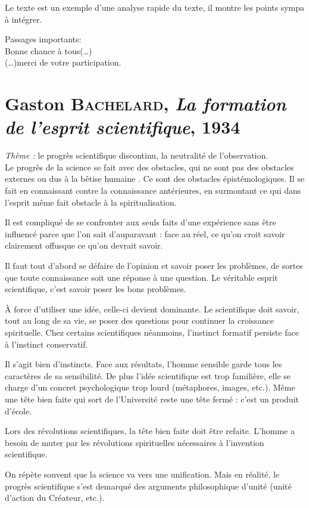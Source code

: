 \documentclass{report}
\begin{document}
	Le texte est un exemple d'une analyse rapide du texte, il montre les points sympa à intégrer.
	
	Passages importants:\\
	\og Bonne chance à tous(\dots)\fg\\
	\og (\dots)merci de votre participation.\fg
	
	\section{Gaston \textsc{{Bachelard}}, \textit{La formation de l'esprit scientifique}, 1934}
	\textit{Thème :} le progrès scientifique discontinu, la neutralité de l'observation. \\
	
	Le progrès de la science se fait avec des obstacles, qui ne sont pas des obstacles externes ou dus à la \og bêtise humaine \fg. Ce sont des obstacles épistémologiques. Il se fait en connaissant \og contre \fg{} la connaissance antérieures, en surmontant ce qui dans l'esprit même fait obstacle à la spiritualisation.
	
	Il est compliqué de se confronter aux seuls faits d'une expérience sans être influencé parce que l'on sait d'auparavant : \og face au réel, ce qu'on croit savoir clairement offusque ce qu'on devrait savoir\fg.
	
	Il faut tout d'abord se défaire de l'opinion et savoir poser les problèmes, de sortes que toute connaissance soit une réponse à une question. Le véritable esprit scientifique, c'est savoir poser les bons problèmes.
	
	À force d'utiliser une idée, celle-ci devient dominante. Le scientifique doit savoir, tout au long de sa vie, se poser des questions pour continuer la croissance spirituelle. Chez certains scientifiques néanmoins, l'instinct formatif persiste face à l'instinct conservatif.
	
	Il s'agit bien d'instincts. Face aux résultats, l'homme sensible garde tous les caractères de sa sensibilité. De plus l'idée scientifique est trop familière, elle se charge d'un concret psychologique trop lourd (métaphores, images, etc.). Même une tête bien faite qui sort de l'Université reste une tête fermé : c'est un produit d'école. 
	
	Lors des révolutions scientifiques, la tête bien faite doit être refaite. L'homme a besoin de muter par les révolutions spirituelles nécessaires à l'invention scientifique.
	
	On répète souvent que la science va vers une unification. Mais en réalité, le progrès scientifique s'est demarqué des arguments philosophique d'unité (unité d'action du Créateur, etc.).
	
\end{document}
